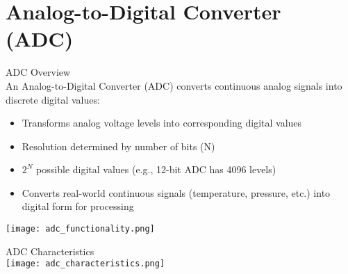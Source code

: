\section{Analog-to-Digital Converter (ADC)}


\begin{definition}{ADC Overview}\\
An Analog-to-Digital Converter (ADC) converts continuous analog signals into discrete digital values:
\begin{itemize}
    \item Transforms analog voltage levels into corresponding digital values
    \item Resolution determined by number of bits (N)
    \item $2^N$ possible digital values (e.g., 12-bit ADC has 4096 levels)
    \item Converts real-world continuous signals (temperature, pressure, etc.) into digital form for processing
\end{itemize}

\texttt{[image: adc\_functionality.png]}
\end{definition}

\begin{concept}{ADC Characteristics}\\
    \texttt{[image: adc\_characteristics.png]}
\end{concept}

